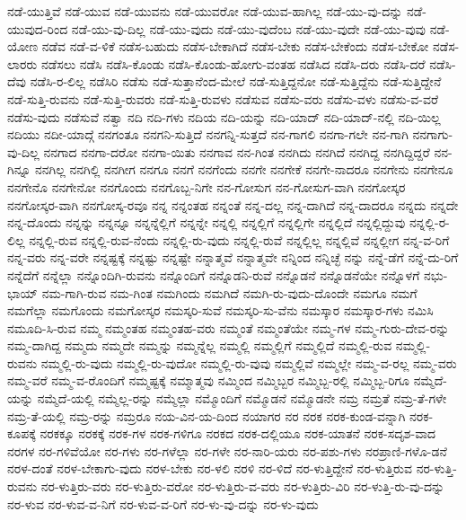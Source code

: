 {ನಡೆ-ಯುತ್ತಿವೆ
ನಡೆ-ಯುವ
ನಡೆ-ಯುವನು
ನಡೆ-ಯುವರೋ
ನಡೆ-ಯುವ-ಹಾಗಿಲ್ಲ
ನಡೆ-ಯು-ವು-ದನ್ನು
ನಡೆ-ಯುವುದ-ರಿಂದ
ನಡೆ-ಯು-ವು-ದಿಲ್ಲ
ನಡೆ-ಯು-ವುದು
ನಡೆ-ಯು-ವುದೆಂಬ
ನಡೆ-ಯು-ವುದೇ
ನಡೆ-ಯು-ವುವು
ನಡೆ-ಯೋಣ
ನಡೆವ
ನಡೆ-ವ-ಳಿಕೆ
ನಡೆಸ-ಬಹುದು
ನಡೆಸ-ಬೇಕಾಗಿದೆ
ನಡೆಸ-ಬೇಕು
ನಡೆಸ-ಬೇಕೆಂದು
ನಡೆಸ-ಬೇಕೋ
ನಡೆಸ-ಲಾರರು
ನಡೆಸಲು
ನಡೆಸಿ
ನಡೆಸಿ-ಕೊಂಡು
ನಡೆಸಿ-ಕೊಂಡು-ಹೋಗು-ವಂತಹ
ನಡೆಸಿದ
ನಡೆಸಿ-ದರು
ನಡೆಸಿ-ದರೆ
ನಡೆಸಿ-ದೆವು
ನಡೆಸಿ-ರ-ಲಿಲ್ಲ
ನಡೆಸಿರಿ
ನಡೆಸು
ನಡೆ-ಸುತ್ತಾನೆಂದ-ಮೇಲೆ
ನಡೆ-ಸುತ್ತಿದ್ದನೋ
ನಡೆ-ಸುತ್ತಿದ್ದೆನು
ನಡೆ-ಸುತ್ತಿದ್ದೇನೆ
ನಡೆ-ಸುತ್ತಿ-ರುವನು
ನಡೆ-ಸುತ್ತಿ-ರುವರು
ನಡೆ-ಸುತ್ತಿ-ರುವಳು
ನಡೆಸುವ
ನಡೆಸು-ವರು
ನಡೆಸು-ವಳು
ನಡೆಸು-ವ-ವರೆ
ನಡೆಸು-ವುದು
ನಡೆಸುವೆ
ನತ್ವಾ
ನದಿ
ನದಿ-ಗಳು
ನದಿಯ
ನದಿ-ಯನ್ನು
ನದಿ-ಯಾದ್
ನದಿ-ಯಾದ್-ನಲ್ಲಿ
ನದಿ-ಯಿಲ್ಲ
ನದಿಯು
ನದೀ-ಯಾದ್ಗೆ
ನನಗಂತೂ
ನನಗನಿ-ಸುತ್ತಿದೆ
ನನಗನ್ನಿ-ಸುತ್ತದೆ
ನನ-ಗಾಗಲಿ
ನನಗಾ-ಗಲೇ
ನನ-ಗಾಗಿ
ನನಗಾಗು-ವು-ದಿಲ್ಲ
ನನಗಾದ
ನನಗಾ-ದರೋ
ನನಗಾ-ಯಿತು
ನನಗಾವ
ನನ-ಗಿಂತ
ನನಗಿದು
ನನಗಿದೆ
ನನಗಿದ್ದ
ನನಗಿದ್ದಿದ್ದರೆ
ನನ-ಗಿನ್ನೂ
ನನಗಿಲ್ಲ
ನನಗಿಲ್ಲಿ
ನನಗೀಗ
ನನಗೂ
ನನಗೆ
ನನಗೆಂದು
ನನಗೇ
ನನಗೇಕೆ
ನನಗೇ-ನಾದರೂ
ನನಗೇನು
ನನಗೇನೂ
ನನಗೇನೊ
ನನಗೇನೋ
ನನಗೊಂದು
ನನಗೊಬ್ಬ-ನಿಗೇ
ನನ-ಗೋಸುಗ
ನನ-ಗೋಸುಗ-ವಾಗಿ
ನನಗೋಸ್ಕರ
ನನಗೋಸ್ಕರ-ವಾಗಿ
ನನಗೋಸ್ಕ-ರವೂ
ನನ್ನ
ನನ್ನಂತಹ
ನನ್ನಂತೆ
ನನ್ನ-ದಲ್ಲ
ನನ್ನ-ದಾಗಿದೆ
ನನ್ನ-ದಾದರೂ
ನನ್ನದು
ನನ್ನದೇ
ನನ್ನ-ದೊಂದು
ನನ್ನನ್ನು
ನನ್ನನ್ನೂ
ನನ್ನನ್ನೆಲ್ಲಿಗೆ
ನನ್ನನ್ನೇ
ನನ್ನಲ್ಲಿ
ನನ್ನಲ್ಲಿಗೆ
ನನ್ನಲ್ಲಿಗೇ
ನನ್ನಲ್ಲಿದೆ
ನನ್ನಲ್ಲಿದ್ದುವು
ನನ್ನಲ್ಲಿ-ರ-ಲಿಲ್ಲ
ನನ್ನಲ್ಲಿ-ರುವ
ನನ್ನಲ್ಲಿ-ರುವ-ನೆಂದು
ನನ್ನಲ್ಲಿ-ರು-ವುದು
ನನ್ನಲ್ಲಿ-ರುವೆ
ನನ್ನಲ್ಲಿಲ್ಲ
ನನ್ನಲ್ಲಿವೆ
ನನ್ನಲ್ಲೀಗ
ನನ್ನ-ವ-ರಿಗೆ
ನನ್ನ-ವರು
ನನ್ನ-ವರೇ
ನನ್ನಷ್ಟಕ್ಕೆ
ನನ್ನಷ್ಟು
ನನ್ನಷ್ಟೇ
ನನ್ನಾತ್ಮವೆ
ನನ್ನಾತ್ಮವೇ
ನನ್ನಿಂದ
ನನ್ನಿಚ್ಛೆ
ನನ್ನು
ನನ್ನೆ-ಡೆಗೆ
ನನ್ನೆ-ದು-ರಿಗೆ
ನನ್ನೆದೆಗೆ
ನನ್ನೆಲ್ಲಾ
ನನ್ನೊಂದಿಗಿ-ರುವನು
ನನ್ನೊಂದಿಗೆ
ನನ್ನೊಡನಿ-ರುವೆ
ನನ್ನೊಡನೆ
ನನ್ನೊಡನೆಯೇ
ನನ್ನೊಳಗೆ
ನಭು-ಭಾಯ್
ನಮ-ಗಾಗಿ-ರುವ
ನಮ-ಗಿಂತ
ನಮಗಿಂದು
ನಮಗಿದೆ
ನಮಗಿ-ರು-ವುದು-ದೊಂದೇ
ನಮಗೂ
ನಮಗೆ
ನಮಗೆಲ್ಲಾ
ನಮಗೊಂದು
ನಮಗೋಸ್ಕರ
ನಮಸ್ಕರಿ-ಸುವೆ
ನಮಸ್ಕರಿ-ಸು-ವೆನು
ನಮಸ್ಕಾರ
ನಮಸ್ಕಾರ-ಗಳು
ನಮಿಸಿ
ನಮೂದಿ-ಸಿ-ರುವ
ನಮ್ಮ
ನಮ್ಮಂತಹ
ನಮ್ಮಂತಹ-ವರು
ನಮ್ಮಂತೆ
ನಮ್ಮಂತೆಯೇ
ನಮ್ಮ-ಗಳ
ನಮ್ಮ-ಗುರು-ದೇವ-ರನ್ನು
ನಮ್ಮ-ದಾಗಿದ್ದ
ನಮ್ಮದು
ನಮ್ಮದೇ
ನಮ್ಮನ್ನು
ನಮ್ಮನ್ನೆಲ್ಲ
ನಮ್ಮಲ್ಲಿ
ನಮ್ಮಲ್ಲಿಗೆ
ನಮ್ಮಲ್ಲಿದೆ
ನಮ್ಮಲ್ಲಿ-ರುವ
ನಮ್ಮಲ್ಲಿ-ರುವನು
ನಮ್ಮಲ್ಲಿ-ರು-ವುದು
ನಮ್ಮಲ್ಲಿ-ರು-ವುದೋ
ನಮ್ಮಲ್ಲಿ-ರು-ವುವು
ನಮ್ಮಲ್ಲಿವೆ
ನಮ್ಮಲ್ಲೇ
ನಮ್ಮ-ವ-ರಲ್ಲ
ನಮ್ಮ-ವರು
ನಮ್ಮ-ವರೆ
ನಮ್ಮ-ವ-ರೊಂದಿಗೆ
ನಮ್ಮಷ್ಟಕ್ಕೆ
ನಮ್ಮಾತ್ಮವು
ನಮ್ಮಿಂದ
ನಮ್ಮಿಬ್ಬರ
ನಮ್ಮಿಬ್ಬ-ರಲ್ಲಿ
ನಮ್ಮಿಬ್ಬ-ರಿಗೂ
ನಮ್ಮೆದೆ-ಯನ್ನು
ನಮ್ಮೆದೆ-ಯಲ್ಲಿ
ನಮ್ಮೆಲ್ಲ-ರನ್ನು
ನಮ್ಮೆಲ್ಲಾ
ನಮ್ಮೊಂದಿಗೆ
ನಮ್ಮೊಡನೆ
ನಮ್ಮೊಡನೇ
ನಮ್ರ
ನಮ್ರತೆ
ನಮ್ರ-ತೆ-ಗಳೇ
ನಮ್ರ-ತೆ-ಯಲ್ಲಿ
ನಮ್ರ-ರನ್ನು
ನಮ್ರರೂ
ನಯ-ವಿನ-ಯ-ದಿಂದ
ನಯಾಗರ
ನರ
ನರಕ
ನರಕ-ಕುಂಡ-ವನ್ನಾಗಿ
ನರಕ-ಕೂಪಕ್ಕೆ
ನರಕಕ್ಕೂ
ನರಕಕ್ಕೆ
ನರಕ-ಗಳ
ನರಕ-ಗಳಿಗೂ
ನರಕದ
ನರಕ-ದಲ್ಲಿಯೂ
ನರಕ-ಯಾತನೆ
ನರಕ-ಸದೃಶ-ವಾದ
ನರಗಳ
ನರ-ಗಳಿವೆಯೋ
ನರ-ಗಳು
ನರ-ಗಳೆಲ್ಲಾ
ನರ-ಗಳೇ
ನರ-ನಾರಿ-ಯರು
ನರ-ಪಶು-ಗಳು
ನರಪ್ರಾಣಿ-ಗಳೊ-ಡನೆ
ನರಳ-ದಂತೆ
ನರಳ-ಬೇಕಾಗು-ವುದು
ನರಳ-ಬೇಕು
ನರ-ಳಲಿ
ನರಳಿ
ನರ-ಳಿದೆ
ನರ-ಳುತ್ತಿದ್ದೇನೆ
ನರ-ಳುತ್ತಿರುವ
ನರ-ಳುತ್ತಿ-ರುವನು
ನರ-ಳುತ್ತಿರು-ವರು
ನರ-ಳುತ್ತಿರು-ವರೋ
ನರ-ಳುತ್ತಿರು-ವ-ವರು
ನರ-ಳುತ್ತಿರು-ವಿರಿ
ನರ-ಳುತ್ತಿ-ರು-ವು-ದನ್ನು
ನರ-ಳುವ
ನರ-ಳುವ-ವ-ನಿಗೆ
ನರ-ಳುವ-ವ-ರಿಗೆ
ನರ-ಳು-ವು-ದನ್ನು
ನರ-ಳು-ವುದು
}
